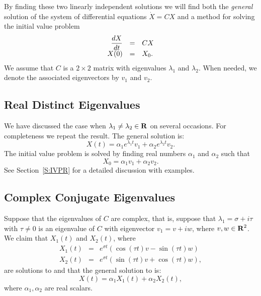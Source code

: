 By finding these two linearly independent solutions we will find both
the {\em general\/} solution of the system of differential equations
$\dot{X}=CX$ and a method for solving the initial value
problem
\begin{equation}  \label{e:eqnA}
\begin{array}{rcl}
\displaystyle\frac{dX}{dt} & = & CX\\
X(0) & = & X_0.
\end{array}
\end{equation}
We assume that $C$ is a $2\times 2$ matrix with eigenvalues $\lambda_1$ and
$\lambda_2$.  When needed, we denote the associated eigenvectors by $v_1$ and
$v_2$.

\subsection*{Real Distinct Eigenvalues}

We have discussed the case when $\lambda_1\neq\lambda_2\in\mbox{$\bf{R}$}$ on several
occasions.  For completeness we repeat the result.  The general solution is:
\begin{equation}  \label{E:RD2}
X(t) = \alpha_1 e^{\lambda_1 t}v_1 + \alpha_2 e^{\lambda_2 t}v_2.
\end{equation}
The initial value problem is solved by finding real numbers $\alpha_1$ and
$\alpha_2$ such that
\[
X_0 = \alpha_1 v_1 + \alpha_2 v_2.
\]
See Section~\ref{S:IVPR} for a detailed discussion with examples.

\subsection*{Complex Conjugate Eigenvalues}

Suppose that the eigenvalues of $C$ are complex, that is, suppose that
$\lambda_1= \sigma+i\tau$ with $\tau\neq 0$ is an eigenvalue of $C$ with
eigenvector $v_1=v+iw$, where $v,w\in\mbox{$\bf{R}$}^2$.  We claim that
$X_1(t)$ and $X_2(t)$, where
\begin{equation}  \label{E:CC1}
\begin{array}{rcl}
X_1(t) & = & e^{\sigma t}(\cos(\tau t)v -\sin(\tau t)w)\\
X_2(t) & = & e^{\sigma t}(\sin(\tau t)v +\cos(\tau t)w),
\end{array}
\end{equation}
are solutions to  and that the general
solution to  is:
\begin{equation}  \label{E:CC2}
X(t) = \alpha_1 X_1(t) + \alpha_2 X_2(t),
\end{equation}
where $\alpha_1, \alpha_2$ are real scalars.

